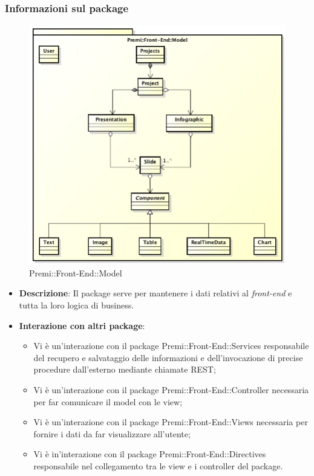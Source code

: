 \subsubsection{Informazioni sul package}
\begin{figure}[h]
	\centering
	\includegraphics[width=0.9\linewidth]{img/front-end_model}
	\caption[Premi::Front-End::Model]{Premi::Front-End::Model}
\end{figure}
\begin{itemize}
	\item \textbf{Descrizione}: Il package serve per mantenere i dati relativi al \textit{\gls{front-end}} e tutta la loro logica di \gls{business}.
	\item \textbf{Interazione con altri package}:
	\begin{itemize}
		\item Vi è un'interazione con il package Premi::Front-End::Services responsabile del recupero e salvataggio delle informazioni e dell'invocazione di precise procedure dall'esterno mediante chiamate REST;
		\item Vi è un'interazione con il package Premi::Front-End::Controller necessaria per far comunicare il model con le view;
		\item Vi è un'interazione con il package Premi::Front-End::Views necessaria per fornire i dati da far visualizzare all'utente;
		\item Vi è in'interazione con il package Premi::Front-End::Directives responsabile nel collegamento tra le view e i controller del package.
	\end{itemize}
\end{itemize}

